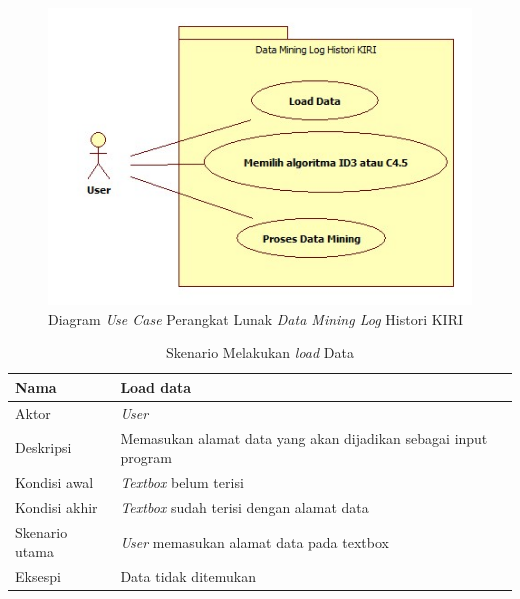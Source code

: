 \begin{figure}[H]
\centering
\includegraphics[scale=1]{Gambar/usecase.jpg}
\caption[Diagram \textsl{Use Case} Perangkat Lunak \textsl{Data Mining Log} Histori KIRI]{Diagram \textsl{Use Case} Perangkat Lunak \textsl{Data Mining Log} Histori KIRI} 
\label{fig:diagramUseCase}
\end{figure}

\begin{table}[H]
\centering
\caption{Skenario Melakukan \textsl{load} Data}
\begin{tabular}{|l|l|}
\hline
Nama           & Load data                                                       \\ \hline
Aktor          & \textit{User}                                                   \\ \hline
Deskripsi      & Memasukan alamat data yang akan dijadikan sebagai input program \\ \hline
Kondisi awal   & \textsl{Textbox} belum terisi                                   \\ \hline
Kondisi akhir  & \textsl{Textbox} sudah terisi dengan alamat data                \\ \hline
Skenario utama & \textit{User} memasukan alamat data pada textbox                \\ \hline
Eksespi        & Data tidak ditemukan                                            \\ \hline
\end{tabular}
\end{table}

